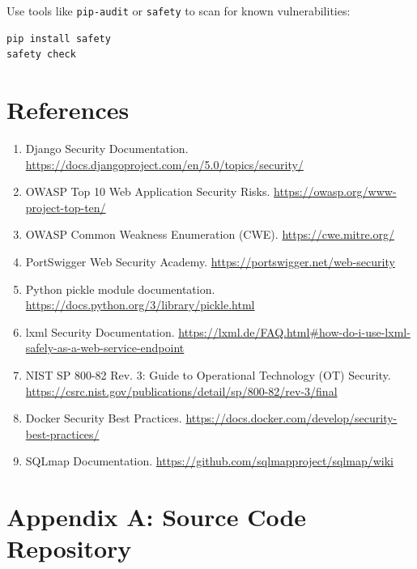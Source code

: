 \documentclass[12pt,a4paper]{article}
\begin{document}
Use tools like \texttt{pip-audit} or \texttt{safety} to scan for known vulnerabilities:

\begin{lstlisting}[language=bash]
pip install safety
safety check
\end{lstlisting}

\newpage

\section{References}

\begin{enumerate}[leftmargin=*]
    \item Django Security Documentation. \url{https://docs.djangoproject.com/en/5.0/topics/security/}
    
    \item OWASP Top 10 Web Application Security Risks. \url{https://owasp.org/www-project-top-ten/}
    
    \item OWASP Common Weakness Enumeration (CWE). \url{https://cwe.mitre.org/}
    
    \item PortSwigger Web Security Academy. \url{https://portswigger.net/web-security}
    
    \item Python pickle module documentation. \url{https://docs.python.org/3/library/pickle.html}
    
    \item lxml Security Documentation. \url{https://lxml.de/FAQ.html#how-do-i-use-lxml-safely-as-a-web-service-endpoint}
    
    \item NIST SP 800-82 Rev. 3: Guide to Operational Technology (OT) Security. \url{https://csrc.nist.gov/publications/detail/sp/800-82/rev-3/final}
    
    \item Docker Security Best Practices. \url{https://docs.docker.com/develop/security-best-practices/}
    
    \item SQLmap Documentation. \url{https://github.com/sqlmapproject/sqlmap/wiki}
\end{enumerate}

\newpage

\appendix

\section{Appendix A: Source Code Repository}
\end{document}
